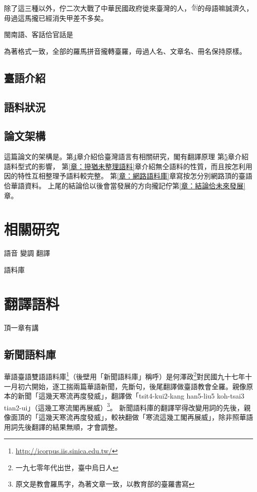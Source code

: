 \documentclass[final,oneside,onecolumn,12pt,a4paper]{book}%
\begin{document}
除了這三種以外，佇二次大戰了中華民國政府徙來臺灣的人，\includegraphics[height=1em]{字/⿰因}的母語嘛誠濟久，毋過這馬攏已經消失甲差不多矣\cite{外省族群的母語與國語}。

閩南語、客話佮官話是

為著格式一致，全部的羅馬拼音攏轉臺羅，毋過人名、文章名、冊名保持原樣。

\section{臺語介紹}
\label{節：臺語介紹}


\section{語料狀況}
\label{節：語料狀況}


\section{論文架構}
\label{節：論文架構}

這篇論文的架構是。第\ref{章：相關研究}章介紹佮臺灣語言有相關研究，閣有翻譯原理
第\ref{章：翻譯語料}章介紹語料型式的影響，
第\ref{章：摻猶未整理語料}章介紹無仝語料的性質，而且按怎利用因的特性互相整理予語料較完整。
第\ref{章：網路語料庫}章寫按怎分別網路頂的臺語佮華語資料。
上尾的結論佮以後會當發展的方向攏記佇第\ref{章：結論佮未來發展}章。

\chapter{相關研究}
\label{章：相關研究}
語音
變調
翻譯

語料庫


\chapter{翻譯語料}
\label{章：翻譯語料}

頂一章有講

\section{新聞語料庫}
\label{節：新聞語料庫}
華語臺語雙語語料庫\footnote{\url{http://icorpus.iis.sinica.edu.tw/}}（後壁用「新聞語料庫」稱呼）是何澤政\footnote{一九七零年代出世，臺中烏日人}對民國九十七年十一月初六開始，逐工揣兩篇華語新聞，先斷句，後尾翻譯做臺語教會全羅。親像原本的新聞「這幾天寒流再度發威」，翻譯做「tsit4-kui2-kang han5-liu5 koh-tsai3 tian2-ui」（這幾工寒流閣再展威）\footnote{原文是教會羅馬字，為著文章一致，以教育部的臺羅書寫}。
新聞語料庫的翻譯罕得改變用詞的先後，親像面頂的「這幾天寒流再度發威」，較袂翻做「寒流這幾工閣再展威」，除非照華語用詞先後翻譯的結果無順，才會調整。
\end{document}
